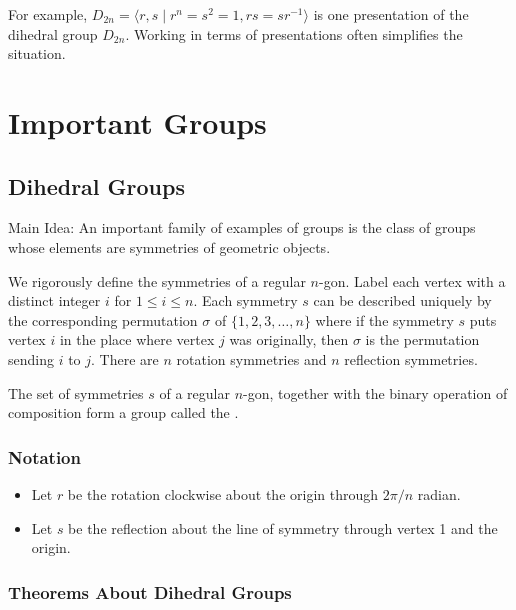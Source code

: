 For example, $D_{2n} = \langle r,s \mid r^n = s^2 = 1, rs = sr^{-1} 
\rangle$ is one presentation of the dihedral group $D_{2n}$. 
Working in terms of presentations often simplifies the situation.


\newpage

\section{Important Groups}

\subsection{Dihedral Groups}\label{dihedral groups}

Main Idea: An important family of examples of groups is the class 
of groups whose elements are symmetries of geometric objects.

We rigorously define the symmetries of a regular $n$-gon. Label 
each vertex with a distinct integer $i$ for $1 \leq i \leq n$. 
Each symmetry $s$ can be described uniquely by the 
corresponding permutation $\sigma$ of $\{1, 2, 3, \dots, n \}$ 
where if the symmetry $s$ puts vertex $i$ in the place where 
vertex $j$ was originally, then $\sigma$ is the permutation 
sending $i$ to $j$. There are $n$ rotation symmetries and $n$ 
reflection symmetries.

\begin{definition}
	The set of symmetries $s$ of a regular $n$-gon, together with 
	the binary operation of composition form a group called the 
	.
\end{definition}

\subsubsection{Notation}

\begin{itemize}
	\item Let $r$ be the rotation clockwise about the origin 
	through $2\pi/n$ radian. 
	
	\item Let $s$ be the reflection about the line of symmetry 
	through vertex 1 and the origin.
\end{itemize}

\subsubsection{Theorems About Dihedral Groups}


